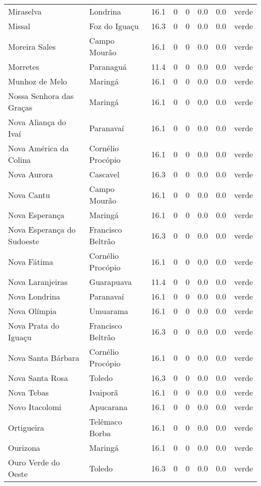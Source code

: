 \begin{longtable}{l|lllllll}
  Miraselva & Londrina & 16.1 & 0 & 0 & 0.0 & 0.0 & verde \\ 
  Missal & Foz do Iguaçu & 16.3 & 0 & 0 & 0.0 & 0.0 & verde \\ 
  Moreira Sales & Campo Mourão & 16.1 & 0 & 0 & 0.0 & 0.0 & verde \\ 
  Morretes & Paranaguá & 11.4 & 0 & 0 & 0.0 & 0.0 & verde \\ 
  Munhoz de Melo & Maringá & 16.1 & 0 & 0 & 0.0 & 0.0 & verde \\ 
  Nossa Senhora das Graças & Maringá & 16.1 & 0 & 0 & 0.0 & 0.0 & verde \\ 
  Nova Aliança do Ivaí & Paranavaí & 16.1 & 0 & 0 & 0.0 & 0.0 & verde \\ 
  Nova América da Colina & Cornélio Procópio & 16.1 & 0 & 0 & 0.0 & 0.0 & verde \\ 
  Nova Aurora & Cascavel & 16.3 & 0 & 0 & 0.0 & 0.0 & verde \\ 
  Nova Cantu & Campo Mourão & 16.1 & 0 & 0 & 0.0 & 0.0 & verde \\ 
  Nova Esperança & Maringá & 16.1 & 0 & 0 & 0.0 & 0.0 & verde \\ 
  Nova Esperança do Sudoeste & Francisco Beltrão & 16.3 & 0 & 0 & 0.0 & 0.0 & verde \\ 
  Nova Fátima & Cornélio Procópio & 16.1 & 0 & 0 & 0.0 & 0.0 & verde \\ 
  Nova Laranjeiras & Guarapuava & 11.4 & 0 & 0 & 0.0 & 0.0 & verde \\ 
  Nova Londrina & Paranavaí & 16.1 & 0 & 0 & 0.0 & 0.0 & verde \\ 
  Nova Olímpia & Umuarama & 16.1 & 0 & 0 & 0.0 & 0.0 & verde \\ 
  Nova Prata do Iguaçu & Francisco Beltrão & 16.3 & 0 & 0 & 0.0 & 0.0 & verde \\ 
  Nova Santa Bárbara & Cornélio Procópio & 16.1 & 0 & 0 & 0.0 & 0.0 & verde \\ 
  Nova Santa Rosa & Toledo & 16.3 & 0 & 0 & 0.0 & 0.0 & verde \\ 
  Nova Tebas & Ivaiporã & 16.1 & 0 & 0 & 0.0 & 0.0 & verde \\ 
  Novo Itacolomi & Apucarana & 16.1 & 0 & 0 & 0.0 & 0.0 & verde \\ 
  Ortigueira & Telêmaco Borba & 16.1 & 0 & 0 & 0.0 & 0.0 & verde \\ 
  Ourizona & Maringá & 16.1 & 0 & 0 & 0.0 & 0.0 & verde \\ 
  Ouro Verde do Oeste & Toledo & 16.3 & 0 & 0 & 0.0 & 0.0 & verde \\ 

\end{longtable}
